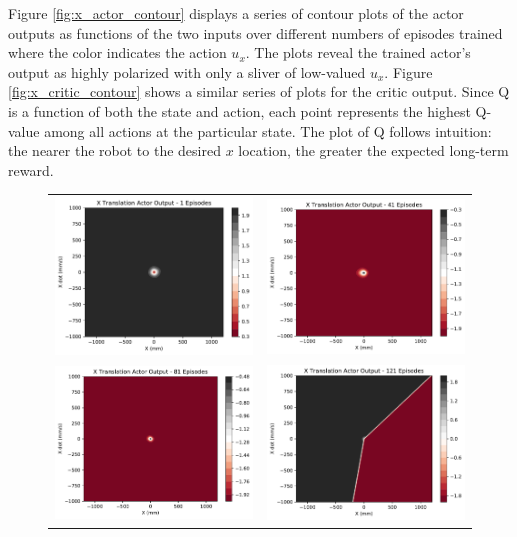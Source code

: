 Figure \ref{fig:x_actor_contour} displays a series of contour plots of the actor outputs as functions of the two inputs over different numbers of episodes trained where the color indicates the action $u_x$. The plots reveal the trained actor's output as highly polarized with only a sliver of low-valued $u_x$. Figure \ref{fig:x_critic_contour} shows a similar series of plots for the critic output. Since Q is a function of both the state and action, each point represents the highest Q-value among all actions at the particular state. The plot of Q follows intuition: the nearer the robot to the desired $x$ location, the greater the expected long-term reward.
\begin{figure}
	\begin{tabular}{cc}
		\includegraphics[width=65mm]{figures/train_figs/transx_actor/Actor1_1.pdf} &  
		\includegraphics[width=65mm]{figures/train_figs/transx_actor/Actor1_41.pdf} \\
		\includegraphics[width=65mm]{figures/train_figs/transx_actor/Actor1_81.pdf} &   \includegraphics[width=65mm]{figures/train_figs/transx_actor/Actor1_121.pdf} \\

\end{tabular}
\end{figure}
